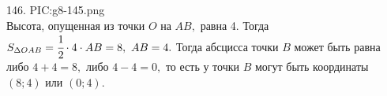 146. {{PIC:g8-145.png}}\\
Высота, опущенная из точки $O$ на $AB,$ равна 4. Тогда $S_{\Delta OAB}=\cfrac{1}{2}\cdot 4 \cdot AB=8,\ AB=4.$ Тогда абсцисса точки $B$ может быть равна либо $4+4=8,$ либо $4-4=0,$ то есть у точки $B$ могут быть координаты $(8;4)$ или $(0;4).$\\
